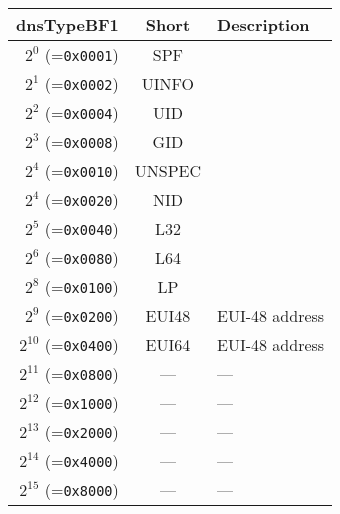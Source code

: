 \documentclass[documentation]{subfiles}
\begin{document}
\begin{longtable}{rcl}
    \toprule
    {\bf dnsTypeBF1} & {\bf Short} & {\bf Description} \\
    \midrule\endhead%
    $2^{0}$  (={\tt 0x0001}) & SPF &  \\
    $2^{1}$  (={\tt 0x0002}) & UINFO &  \\
    $2^{2}$  (={\tt 0x0004}) & UID &  \\
    $2^{3}$  (={\tt 0x0008}) & GID & \\
    $2^{4}$  (={\tt 0x0010}) & UNSPEC &  \\
    $2^{4}$  (={\tt 0x0020}) & NID &  \\
    $2^{5}$  (={\tt 0x0040}) & L32 &  \\
    $2^{6}$  (={\tt 0x0080}) & L64 &  \\
    $2^{8}$  (={\tt 0x0100}) & LP &  \\
    $2^{9}$  (={\tt 0x0200}) & EUI48  & EUI-48 address \\
    $2^{10}$ (={\tt 0x0400}) & EUI64 & EUI-48 address \\
    $2^{11}$ (={\tt 0x0800}) & --- & --- \\
    $2^{12}$ (={\tt 0x1000}) & --- & --- \\
    $2^{13}$ (={\tt 0x2000}) & --- & --- \\
    $2^{14}$ (={\tt 0x4000}) & --- & --- \\
    $2^{15}$ (={\tt 0x8000}) & --- & --- \\
    \bottomrule
\end{longtable}
\end{document}

